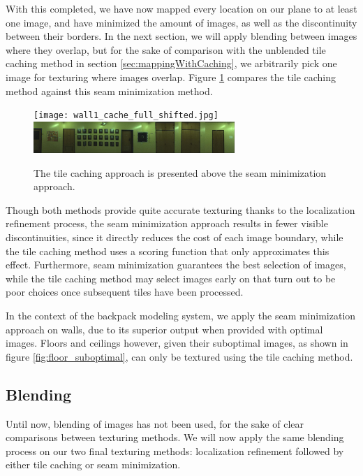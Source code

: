 \documentclass[10pt,twocolumn,letterpaper]{article}
\begin{document}
With this completed, we have now mapped every location on our plane to
at least one image, and have minimized the amount of images, as well
as the discontinuity between their borders. In the next section, we
will apply blending between images where they overlap, but for the
sake of comparison with the unblended tile caching method in section
\ref{sec:mappingWithCaching}, we arbitrarily pick one image for
texturing where images overlap. Figure \ref{fig:compare_unblended}
compares the tile caching method against this seam minimization
method.

\begin{figure}
  \centering
  \texttt{[image: wall1\_cache\_full\_shifted.jpg]}
  \includegraphics[width=3in]{wall1_dynprog_noblend.jpg}
  \caption{The tile caching approach is presented above the seam
    minimization approach.}
  \label{fig:compare_unblended}
\end{figure}


Though both methods provide quite accurate texturing thanks to the
localization refinement process, the seam minimization approach
results in fewer visible discontinuities, since it directly reduces
the cost of each image boundary, while the tile caching method uses a
scoring function that only approximates this effect. Furthermore, seam
minimization guarantees the best selection of images, while the tile
caching method may select images early on that turn out to be poor
choices once subsequent tiles have been processed.

In the context of the backpack modeling system, we apply the seam
minimization approach on walls, due to its superior output when
provided with optimal images. Floors and ceilings however, given their
suboptimal images, as shown in figure \ref{fig:floor_suboptimal}, can
only be textured using the tile caching method.

\subsection{Blending}
\label{sec:blending}
Until now, blending of images has not been used, for the sake of clear
comparisons between texturing methods. We will now apply the same
blending process on our two final texturing methods: localization
refinement followed by either tile caching or seam minimization.
\end{document}
